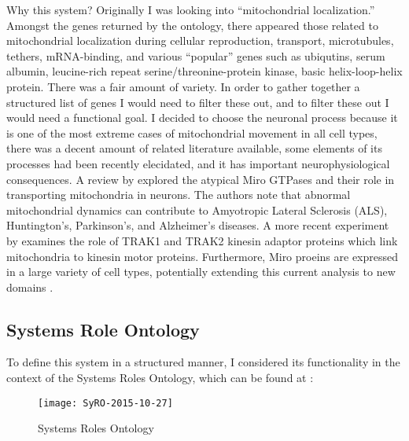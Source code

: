 Why this system? Originally I was looking into ``mitochondrial localization.''
Amongst the genes returned by the ontology, there appeared those related to
mitochondrial localization during cellular reproduction, transport,
microtubules, tethers, mRNA-binding, and various ``popular'' genes such as
ubiqutins, serum  albumin, leucine-rich repeat serine/threonine-protein kinase,
basic helix-loop-helix protein. There was a fair amount of variety. In order to
gather together a structured list of genes I would need to filter these out, and
to filter these out I would need a functional goal. I decided to choose the
neuronal process because it is one of the most extreme cases of mitochondrial
movement in all cell types, there was a decent amount of related literature
available, some elements of its processes had been recently elecidated, and it
has important neurophysiological consequences. A review by \cite{Reis2009}
explored the atypical Miro GTPases and their role in transporting mitochondria
in neurons. The authors note that abnormal mitochondrial dynamics can contribute
to Amyotropic Lateral Sclerosis (ALS), Huntington's, Parkinson's, and
Alzheimer's diseases. A more recent experiment by \cite{Loss2015} examines the
role of TRAK1 and TRAK2 kinesin adaptor proteins which link mitochondria to
kinesin motor proteins. Furthermore, Miro proeins are expressed in a large
variety of cell types, potentially extending this current analysis to new
domains \citep{Reis2009}.

\subsection{Systems Role Ontology}

To define this system in a structured manner, I considered its functionality
in the context of the Systems Roles Ontology, which can be found at \SyRO:

\begin{figure}[h]
  \centering
    \texttt{[image: SyRO-2015-10-27]}
  \caption{Systems Roles Ontology}
\end{figure}

